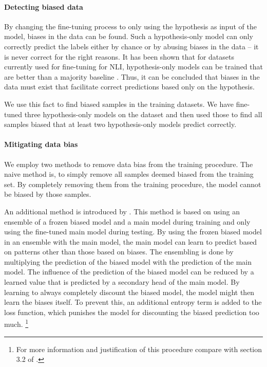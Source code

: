 \paragraph{Detecting biased data}

By changing the fine-tuning process to only using the hypothesis as input of the model, biases in the data can be found. Such a hypothesis-only model can only correctly predict the labels either by chance or by abusing biases in the data -- it is never correct for the right reasons. It has been shown that for datasets currently used for fine-tuning for \acs{NLI}, hypothesis-only models can be trained that are better than a majority baseline \citep{hyponly}. Thus, it can be concluded that biases in the data must exist that facilitate correct predictions based only on the hypothesis.

We use this fact to find biased samples in the training datasets. We have fine-tuned three hypothesis-only models on the dataset and then used those to find all samples biased that at least two hypothesis-only models predict correctly.

\paragraph{Mitigating data bias}

We employ two methods to remove data bias from the training procedure. The naive method is, to simply remove all samples deemed biased from the training set. By completely removing them from the training procedure, the model cannot be biased by those samples.

An additional method is introduced by \citet{ensemble}. This method is based on using an ensemble of a frozen biased model and a main model during training and only using the fine-tuned main model during testing. By using the frozen biased model in an ensemble with the main model, the main model can learn to predict based on patterns other than those based on biases. The ensembling is done by multiplying the prediction of the biased model with the prediction of the main model. The influence of the prediction of the biased model can be reduced by a learned value that is predicted by a secondary head of the main model. By learning to always completely discount the biased model, the model might then learn the biases itself. To prevent this, an additional entropy term is added to the loss function, which punishes the model for discounting the biased prediction too much. \footnote{For more information and justification of this procedure compare with section 3.2 of \cite{ensemble}.}

